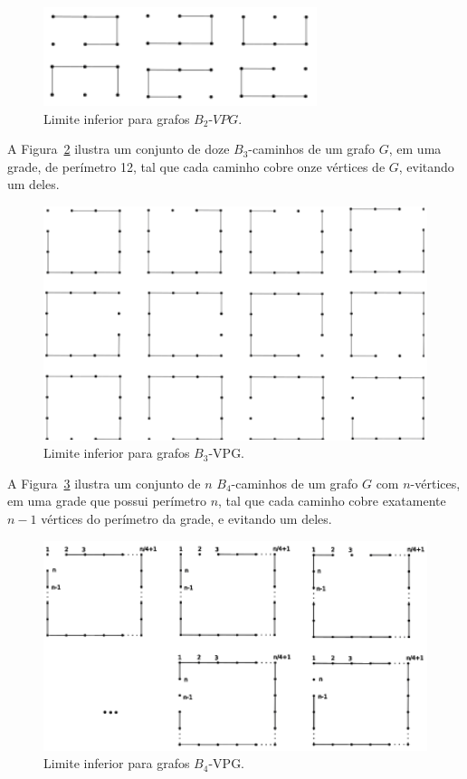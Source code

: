 \begin{figure}[!h]
    \centering
    \includegraphics[width=8cm]{./img/lower-bound-B2-VPG.pdf}
    \caption{Limite inferior para grafos $B_2$-$VPG$.}
    \label{VPG:lower-B2}
\end{figure}


A Figura~\ref{VPG:lower-B3} ilustra um conjunto de doze $B_3$-caminhos de um grafo $G$, em uma grade, de perímetro 12, tal que cada caminho cobre  onze vértices de $G$, evitando um deles.

\begin{figure}[!h]
    \centering
    \includegraphics[width=12cm]{./img/lower-bound-B3-VPG.pdf}
    \caption{Limite inferior para grafos $B_3$-VPG.}
    \label{VPG:lower-B3}
\end{figure}

A Figura~\ref{VPG:lower-B4} ilustra um conjunto de $n$ $B_4$-caminhos de um grafo $G$ com $n$-vértices, em uma grade que possui perímetro $n$,  tal que cada caminho cobre exatamente   $n-1$  vértices do perímetro da grade, e evitando um deles. 

\begin{figure}[!h]
    \centering
    \includegraphics[width=12cm]{./img/lower-bound-B4-VPG.pdf}
    \caption{Limite inferior para grafos $B_4$-VPG.}
    \label{VPG:lower-B4}
\end{figure}

